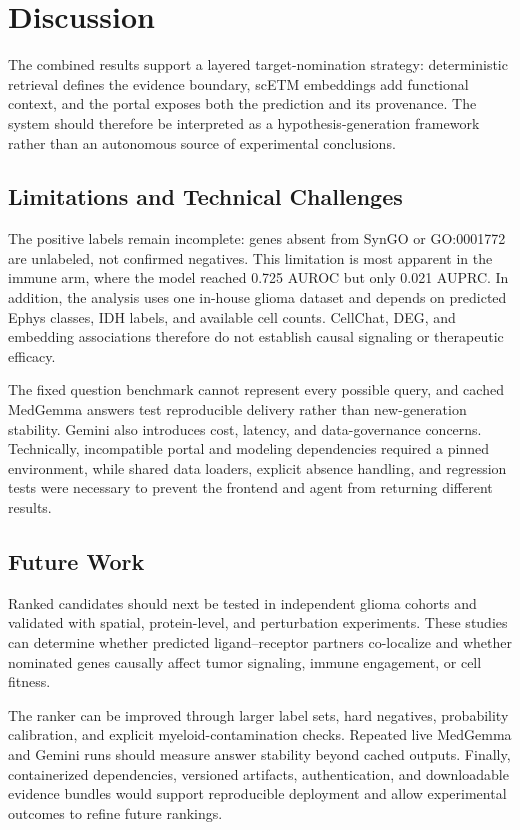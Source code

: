 \documentclass[conference]{IEEEtran}
\begin{document}
\section{Discussion}

The combined results support a layered target-nomination strategy: deterministic retrieval defines the evidence boundary, scETM embeddings add functional context, and the portal exposes both the prediction and its provenance. The system should therefore be interpreted as a hypothesis-generation framework rather than an autonomous source of experimental conclusions.

\subsection{Limitations and Technical Challenges}

The positive labels remain incomplete: genes absent from SynGO or GO:0001772 are unlabeled, not confirmed negatives. This limitation is most apparent in the immune arm, where the model reached 0.725 AUROC but only 0.021 AUPRC. In addition, the analysis uses one in-house glioma dataset and depends on predicted Ephys classes, IDH labels, and available cell counts. CellChat, DEG, and embedding associations therefore do not establish causal signaling or therapeutic efficacy.

The fixed question benchmark cannot represent every possible query, and cached MedGemma answers test reproducible delivery rather than new-generation stability. Gemini also introduces cost, latency, and data-governance concerns. Technically, incompatible portal and modeling dependencies required a pinned environment, while shared data loaders, explicit absence handling, and regression tests were necessary to prevent the frontend and agent from returning different results.

\subsection{Future Work}

Ranked candidates should next be tested in independent glioma cohorts and validated with spatial, protein-level, and perturbation experiments. These studies can determine whether predicted ligand--receptor partners co-localize and whether nominated genes causally affect tumor signaling, immune engagement, or cell fitness.

The ranker can be improved through larger label sets, hard negatives, probability calibration, and explicit myeloid-contamination checks. Repeated live MedGemma and Gemini runs should measure answer stability beyond cached outputs. Finally, containerized dependencies, versioned artifacts, authentication, and downloadable evidence bundles would support reproducible deployment and allow experimental outcomes to refine future rankings.
\end{document}
